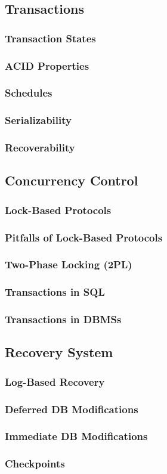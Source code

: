\subsection{Transactions}
\subsubsection{Transaction States}
\subsubsection{ACID Properties}
\subsubsection{Schedules}
\subsubsection{Serializability}
\subsubsection{Recoverability}

\subsection{Concurrency Control}
\subsubsection{Lock-Based Protocols}
\subsubsection{Pitfalls of Lock-Based Protocols}
\subsubsection{Two-Phase Locking (2PL)}
\subsubsection{Transactions in SQL}
\subsubsection{Transactions in DBMSs}

\subsection{Recovery System}
\subsubsection{Log-Based Recovery}
\subsubsection{Deferred DB Modifications}
\subsubsection{Immediate DB Modifications}
\subsubsection{Checkpoints}